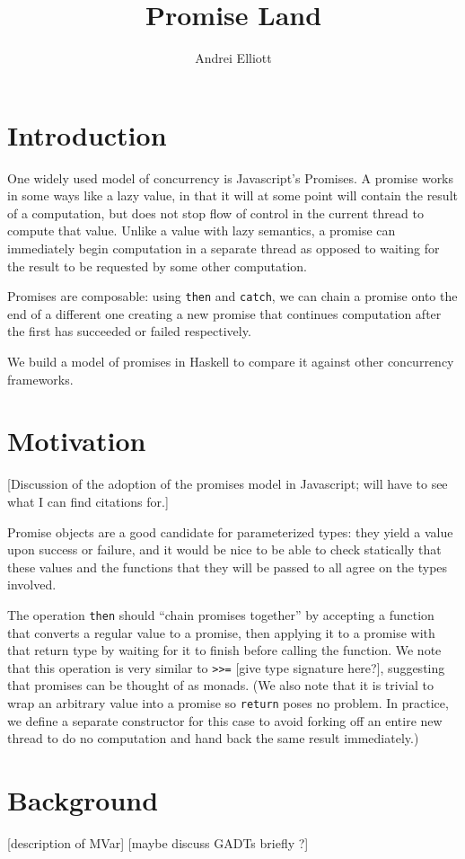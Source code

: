 \documentclass[sigplan,screen]{acmart}
\title{Promise Land}
\author{Andrei Elliott}
\newcommand{\lit}[1]{\lstinline{#1}}
\begin{document}
\section{Introduction}
One widely used model of concurrency is Javascript's Promises.  A promise works in some ways like a lazy value, in that it will at some point will contain the result of a computation, but does not stop flow of control in the current thread to compute that value.  Unlike a value with lazy semantics, a promise can immediately begin computation in a separate thread as opposed to waiting for the result to be requested by some other computation.

Promises are composable: using \lit{then} and \lit{catch}, we can chain a promise onto the end of a different one creating a new promise that continues computation after the first has succeeded or failed respectively.

We build a model of promises in Haskell to compare it against other concurrency frameworks.
\section{Motivation}
[Discussion of the adoption of the promises model in Javascript; will have to see what I can find citations for.]

Promise objects are a good candidate for parameterized types: they yield a value upon success or failure, and it would be nice to be able to check statically that these values and the functions that they will be passed to all agree on the types involved.

The operation \lit{then} should ``chain promises together'' by accepting a function that converts a regular value to a promise, then applying it to a promise with that return type by waiting for it to finish before calling the function.  We note that this operation is very similar to \lit{>>=} [give type signature here?], suggesting that promises can be thought of as monads.  (We also note that it is trivial to wrap an arbitrary value into a promise so \lit{return} poses no problem.  In practice, we define a separate constructor for this case to avoid forking off an entire new thread to do no computation and hand back the same result immediately.)

\section{Background}
[description of MVar]
[maybe discuss GADTs briefly ?]
\end{document}
